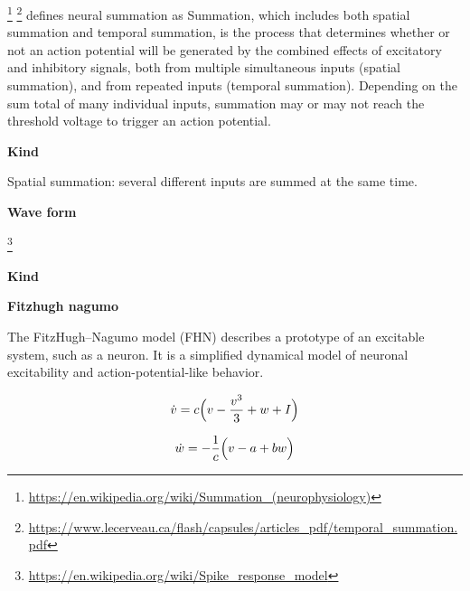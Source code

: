 \documentclass{book}
\providecommand{\ProjectDeepHeading}[2]{%
    \par\medskip\noindent\textbf{#2}\par\smallskip
}
\providecommand{\seeherefooter}[1]{\footnote{\url{#1}}}
\begin{document}
\seeherefooter{https://en.wikipedia.org/wiki/Summation_(neurophysiology)}
    \seeherefooter{https://www.lecerveau.ca/flash/capsules/articles_pdf/temporal_summation.pdf} defines neural summation as Summation, which includes both spatial summation and temporal summation, is the process that determines whether or not an action potential will be generated by the combined effects of excitatory and inhibitory signals, both from multiple simultaneous inputs (spatial summation), and from repeated inputs (temporal summation). Depending on the sum total of many individual inputs, summation may or may not reach the threshold voltage to trigger an action potential.

\ProjectDeepHeading{6}{Kind}


Spatial summation: several different inputs are summed at the same time.

\ProjectDeepHeading{5}{Wave form}


\seeherefooter{https://en.wikipedia.org/wiki/Spike_response_model}

\ProjectDeepHeading{6}{Kind}

\ProjectDeepHeading{7}{Fitzhugh nagumo}


The FitzHugh--Nagumo model (FHN)\cite{cebrian-lacasa-2025-six-decades-of-the-fitzhugh-nagumo-model-a-guide-through-its-spatio-temporal-dynamics-and-influence-across-disciplines} describes a prototype of an excitable system, such as a neuron.
    It is a simplified dynamical model of neuronal excitability and action-potential-like behavior.
    
    \begin{equation}
        \dot{v}
        =
        c
        \Bigl(
        v
        -
        \frac{v^{3}}{3}
        +
        w
        +
        I
        \Bigr)
    \end{equation}
    
    \begin{equation}
        \dot{w}
        =
        -
        \frac{1}{c}
        \Bigl(
        v
        -
        a
        +
        bw
        \Bigr)
    \end{equation}
    
\end{document}
